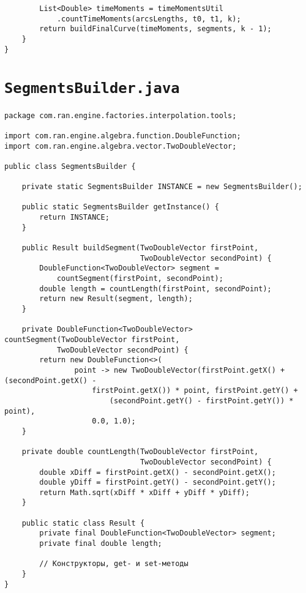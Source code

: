 \begin{verbatim}
        List<Double> timeMoments = timeMomentsUtil
            .countTimeMoments(arcsLengths, t0, t1, k);
        return buildFinalCurve(timeMoments, segments, k - 1);
    }
}
\end{verbatim}

\section*{\texttt{SegmentsBuilder.java}}
\begin{verbatim}
package com.ran.engine.factories.interpolation.tools;

import com.ran.engine.algebra.function.DoubleFunction;
import com.ran.engine.algebra.vector.TwoDoubleVector;

public class SegmentsBuilder {

    private static SegmentsBuilder INSTANCE = new SegmentsBuilder();

    public static SegmentsBuilder getInstance() {
        return INSTANCE;
    }

    public Result buildSegment(TwoDoubleVector firstPoint,
                               TwoDoubleVector secondPoint) {
        DoubleFunction<TwoDoubleVector> segment =
            countSegment(firstPoint, secondPoint);
        double length = countLength(firstPoint, secondPoint);
        return new Result(segment, length);
    }

    private DoubleFunction<TwoDoubleVector> countSegment(TwoDoubleVector firstPoint,
            TwoDoubleVector secondPoint) {
        return new DoubleFunction<>(
                point -> new TwoDoubleVector(firstPoint.getX() + (secondPoint.getX() -
                    firstPoint.getX()) * point, firstPoint.getY() +
                        (secondPoint.getY() - firstPoint.getY()) * point),
                    0.0, 1.0);
    }

    private double countLength(TwoDoubleVector firstPoint,
                               TwoDoubleVector secondPoint) {
        double xDiff = firstPoint.getX() - secondPoint.getX();
        double yDiff = firstPoint.getY() - secondPoint.getY();
        return Math.sqrt(xDiff * xDiff + yDiff * yDiff);
    }

    public static class Result {
        private final DoubleFunction<TwoDoubleVector> segment;
        private final double length;

        // Конструкторы, get- и set-методы
    }
}
\end{verbatim}

